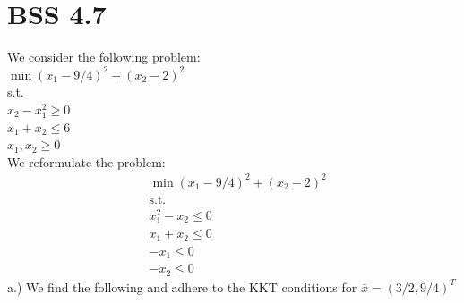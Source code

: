 \documentclass[12pt]{article}
\begin{document}
\section{BSS 4.7}
We consider the following problem:\\
\quad $\min (x_1 - 9/4)^2 + (x_2-2)^2$ \\
\quad s.t.\\
\quad $x_2 - x_1^2 \geq 0$\\
\quad $x_1 + x_2 \leq 6$\\
\quad $x_1 , x_2 \geq 0$\\
We reformulate the problem: \\ 
    \begin{align*}
        &\min (x_1 - 9/4)^2 + (x_2-2)^2\\
        &\text{s.t.} \\
        &x_1^2 - x_2 \leq 0\\
        &x_1 + x_2 \leq 0\\
        &-x_1 \leq 0\\
        &-x_2 \leq 0
    \end{align*}
a.) We find the following and adhere to the KKT conditions for $\bar x = (3/2 , 9/4) ^T$\\
\end{document}

